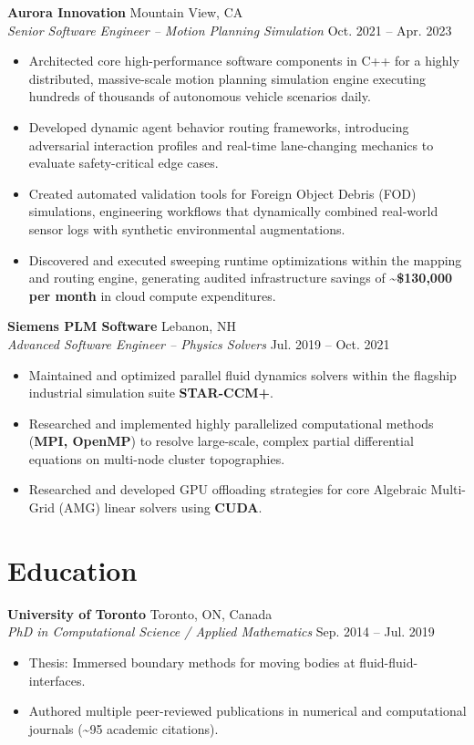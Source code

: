\documentclass[10pt,letterpaper]{article}
\newcommand{\resumeItem}[1]{\item\small{#1}}
\newcommand{\resumeHeading}[4]{
  \noindent\textbf{#1} \hfill #2 \\
  \noindent\textit{#3} \hfill \small{#4} \\
  \vspace{2pt}
}
\begin{document}
\resumeHeading{Aurora Innovation}{Mountain View, CA}{Senior Software Engineer -- Motion Planning Simulation}{Oct. 2021 -- Apr. 2023}
\begin{itemize}[itemsep=4pt]
    \resumeItem{Architected core high-performance software components in C++ for a highly distributed, massive-scale motion planning simulation engine executing hundreds of thousands of autonomous vehicle scenarios daily.}
    \resumeItem{Developed dynamic agent behavior routing frameworks, introducing adversarial interaction profiles and real-time lane-changing mechanics to evaluate safety-critical edge cases.}
    \resumeItem{Created automated validation tools for Foreign Object Debris (FOD) simulations, engineering workflows that dynamically combined real-world sensor logs with synthetic environmental augmentations.}
    \resumeItem{Discovered and executed sweeping runtime optimizations within the mapping and routing engine, generating audited infrastructure savings of \textbf{\textasciitilde\$130,000 per month} in cloud compute expenditures.}
\end{itemize}

\vspace{6pt}

\resumeHeading{Siemens PLM Software}{Lebanon, NH}{Advanced Software Engineer -- Physics Solvers}{Jul. 2019 -- Oct. 2021}
\begin{itemize}[itemsep=4pt]
    \resumeItem{Maintained and optimized parallel fluid dynamics solvers within the flagship industrial simulation suite \textbf{STAR-CCM+}.}
    \resumeItem{Researched and implemented highly parallelized computational methods (\textbf{MPI, OpenMP}) to resolve large-scale, complex partial differential equations on multi-node cluster topographies.}
    \resumeItem{Researched and developed GPU offloading strategies for core Algebraic Multi-Grid (AMG) linear solvers using \textbf{CUDA}.}
\end{itemize}

\section{Education}
\noindent\textbf{University of Toronto} \hfill Toronto, ON, Canada \\
\textit{PhD in Computational Science / Applied Mathematics} \hfill Sep. 2014 -- Jul. 2019 \\
\vspace{-2pt}
\begin{itemize}[leftmargin=15pt, itemsep=2pt]
    \resumeItem{Thesis: Immersed boundary methods for moving bodies at fluid-fluid-interfaces.}
    \resumeItem{Authored multiple peer-reviewed publications in numerical and computational journals (\textasciitilde 95 academic citations).}
\end{itemize}
\end{document}
